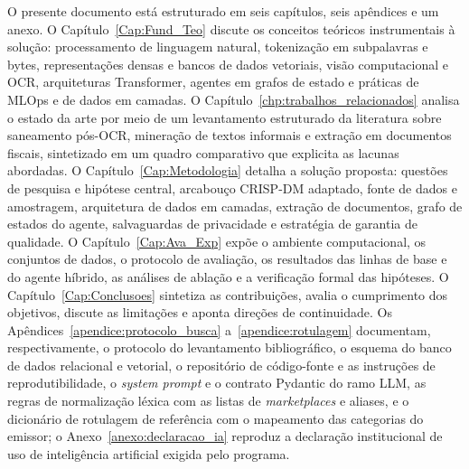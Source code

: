 O presente documento está estruturado em seis capítulos, seis apêndices e um anexo. O Capítulo~\ref{Cap:Fund_Teo} discute os conceitos teóricos instrumentais à solução: processamento de linguagem natural, tokenização em subpalavras e bytes, representações densas e bancos de dados vetoriais, visão computacional e OCR, arquiteturas Transformer, agentes em grafos de estado e práticas de MLOps e de dados em camadas. O Capítulo~\ref{chp:trabalhos_relacionados} analisa o estado da arte por meio de um levantamento estruturado da literatura sobre saneamento pós-OCR, mineração de textos informais e extração em documentos fiscais, sintetizado em um quadro comparativo que explicita as lacunas abordadas. O Capítulo~\ref{Cap:Metodologia} detalha a solução proposta: questões de pesquisa e hipótese central, arcabouço CRISP-DM adaptado, fonte de dados e amostragem, arquitetura de dados em camadas, extração de documentos, grafo de estados do agente, salvaguardas de privacidade e estratégia de garantia de qualidade. O Capítulo~\ref{Cap:Ava_Exp} expõe o ambiente computacional, os conjuntos de dados, o protocolo de avaliação, os resultados das linhas de base e do agente híbrido, as análises de ablação e a verificação formal das hipóteses. O Capítulo~\ref{Cap:Conclusoes} sintetiza as contribuições, avalia o cumprimento dos objetivos, discute as limitações e aponta direções de continuidade. Os Apêndices~\ref{apendice:protocolo_busca} a~\ref{apendice:rotulagem} documentam, respectivamente, o protocolo do levantamento bibliográfico, o esquema do banco de dados relacional e vetorial, o repositório de código-fonte e as instruções de reprodutibilidade, o \textit{system prompt} e o contrato Pydantic do ramo LLM, as regras de normalização léxica com as listas de \textit{marketplaces} e aliases, e o dicionário de rotulagem de referência com o mapeamento das categorias do emissor; o Anexo~\ref{anexo:declaracao_ia} reproduz a declaração institucional de uso de inteligência artificial exigida pelo programa.

